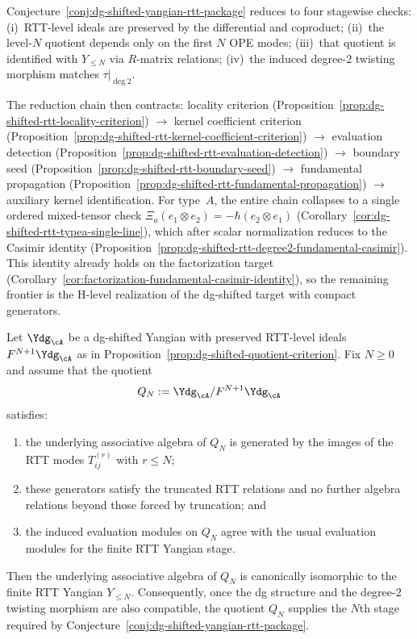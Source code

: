 \begin{remark}
\label{rem:dg-shifted-quotient-route}
Conjecture~\ref{conj:dg-shifted-yangian-rtt-package} reduces to four stagewise checks: (i)~RTT-level ideals are preserved by the differential and coproduct; (ii)~the level-$N$ quotient depends only on the first $N$ OPE modes; (iii)~that quotient is identified with $Y_{\le N}$ via $R$-matrix relations; (iv)~the induced degree-$2$ twisting morphism matches $\tau|_{\deg 2}$.

The reduction chain then contracts: locality criterion (Proposition~\ref{prop:dg-shifted-rtt-locality-criterion}) $\to$ kernel coefficient criterion (Proposition~\ref{prop:dg-shifted-rtt-kernel-coefficient-criterion}) $\to$ evaluation detection (Proposition~\ref{prop:dg-shifted-rtt-evaluation-detection}) $\to$ boundary seed (Proposition~\ref{prop:dg-shifted-rtt-boundary-seed}) $\to$ fundamental propagation (Proposition~\ref{prop:dg-shifted-rtt-fundamental-propagation}) $\to$ auxiliary kernel identification.  For type~$A$, the entire chain collapses to a single ordered mixed-tensor check $\Xi_a(e_1\otimes e_2)=-\hbar(e_2\otimes e_1)$ (Corollary~\ref{cor:dg-shifted-rtt-typea-single-line}), which after scalar normalization reduces to the Casimir identity (Proposition~\ref{prop:dg-shifted-rtt-degree2-fundamental-casimir}).  This identity already holds on the factorization target (Corollary~\ref{cor:factorization-fundamental-casimir-identity}), so the remaining frontier is the H-level realization of the dg-shifted target with compact generators.
\end{remark}

\begin{proposition}
\label{prop:dg-shifted-rtt-presentation-criterion}
Let $\Ydg_{\cA}$ be a dg-shifted Yangian with preserved RTT-level ideals
$F^{N+1}\Ydg_{\cA}$ as in
Proposition~\ref{prop:dg-shifted-quotient-criterion}.  Fix $N \ge 0$ and
assume that the quotient
\[
Q_N:=\Ydg_{\cA}/F^{N+1}\Ydg_{\cA}
\]
satisfies:
\begin{enumerate}[label=\textup{(\roman*)}]
\item the underlying associative algebra of $Q_N$ is generated by the
  images of the RTT modes $T_{ij}^{(r)}$ with $r \le N$;
\item these generators satisfy the truncated RTT relations and no
  further algebra relations beyond those forced by truncation; and
\item the induced evaluation modules on $Q_N$ agree with the usual
  evaluation modules for the finite RTT Yangian stage.
\end{enumerate}
Then the underlying associative algebra of $Q_N$ is canonically
isomorphic to the finite RTT Yangian $Y_{\le N}$.  Consequently, once
the dg structure and the degree-$2$ twisting morphism are also
compatible, the quotient $Q_N$ supplies the $N$th stage required by
Conjecture~\ref{conj:dg-shifted-yangian-rtt-package}.
\end{proposition}

